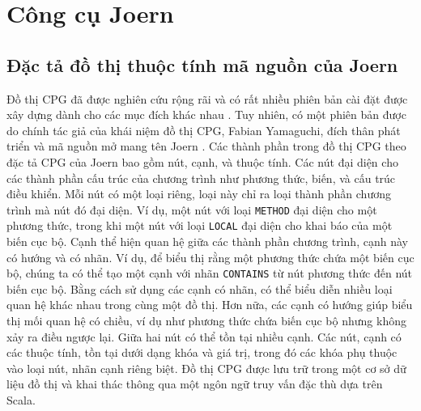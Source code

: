 \section{Công cụ Joern}

\subsection{Đặc tả đồ thị thuộc tính mã nguồn của Joern}


Đồ thị CPG đã được nghiên cứu rộng rãi và có rất nhiều phiên bản cài đặt được xây dựng dành cho các mục đích khác nhau \cite{ kuchler2022representing, weiss2022language}.
Tuy nhiên, có một phiên bản được do chính tác giả của khái niệm đồ thị CPG, Fabian Yamaguchi, đích thân phát triển và mã nguồn mở mang tên Joern \cite{joernJoernHunteraposs}.
Các thành phần trong đồ thị CPG theo đặc tả CPG của Joern bao gồm nút, cạnh, và thuộc tính.
Các nút đại diện cho các thành phần cấu trúc của chương trình như phương thức, biến, và cấu trúc điều khiển.
Mỗi nút có một loại riêng, loại này chỉ ra loại thành phần chương trình mà nút đó đại diện.
Ví dụ, một nút với loại \texttt{METHOD} đại diện cho một phương thức, trong khi một nút với loại \texttt{LOCAL} đại diện cho khai báo của một biến cục bộ.
Cạnh thể hiện quan hệ giữa các thành phần chương trình, cạnh này có hướng và có nhãn.
Ví dụ, để biểu thị rằng một phương thức chứa một biến cục bộ, chúng ta có thể tạo một cạnh với nhãn \texttt{CONTAINS} từ nút phương thức đến nút biến cục bộ.
Bằng cách sử dụng các cạnh có nhãn, có thể biểu diễn nhiều loại quan hệ khác nhau trong cùng một đồ thị.
Hơn nữa, các cạnh có hướng giúp biểu thị mối quan hệ có chiều, ví dụ như phương thức chứa biến cục bộ nhưng không xảy ra điều ngược lại.
Giữa hai nút có thể tồn tại nhiều cạnh.
Các nút, cạnh có các thuộc tính, tồn tại dưới dạng khóa và giá trị, trong đó các khóa phụ thuộc vào loại nút, nhãn cạnh riêng biệt.
Đồ thị CPG được lưu trữ trong một cơ sở dữ liệu đồ thị và khai thác thông qua một ngôn ngữ truy vấn đặc thù dựa trên Scala.

